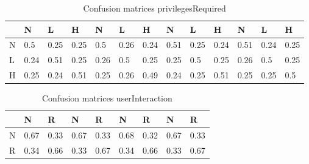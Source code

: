\documentclass[11pt]{article}
\begin{document}
\begin{table}
	\caption{Confusion matrices privilegesRequired}
	\label{table:mitre-privilegesRequired}
	\begin{center}
		\begin{tabular}{l|l|l|l|l|l|l|l|l|l|l|l|l}\textbf{} & \textbf{N} & \textbf{L} & \textbf{H} & \textbf{N} & \textbf{L} & \textbf{H} & \textbf{N} & \textbf{L} & \textbf{H} & \textbf{N} & \textbf{L} & \textbf{H} \\
               \hline
               N                                    & 0.5        & 0.25       & 0.25       & 0.5        & 0.26       & 0.24       & 0.51       & 0.25       & 0.24       & 0.51       & 0.24       & 0.25       \\
               L                                    & 0.24       & 0.51       & 0.25       & 0.26       & 0.5        & 0.25       & 0.25       & 0.5        & 0.25       & 0.26       & 0.5        & 0.25       \\
               H                                    & 0.25       & 0.24       & 0.51       & 0.25       & 0.26       & 0.49       & 0.24       & 0.25       & 0.51       & 0.25       & 0.25       & 0.5        \\
		\end{tabular}
	\end{center}
\end{table}


\begin{table}
	\caption{Confusion matrices userInteraction}
	\label{table:mitre-userInteraction}
	\begin{center}
		\begin{tabular}{l|l|l|l|l|l|l|l|l}\textbf{} & \textbf{N} & \textbf{R} & \textbf{N} & \textbf{R} & \textbf{N} & \textbf{R} & \textbf{N} & \textbf{R} \\
               \hline
               N                            & 0.67       & 0.33       & 0.67       & 0.33       & 0.68       & 0.32       & 0.67       & 0.33       \\
               R                            & 0.34       & 0.66       & 0.33       & 0.67       & 0.34       & 0.66       & 0.33       & 0.67       \\
		\end{tabular}
	\end{center}
\end{table}
\end{document}

